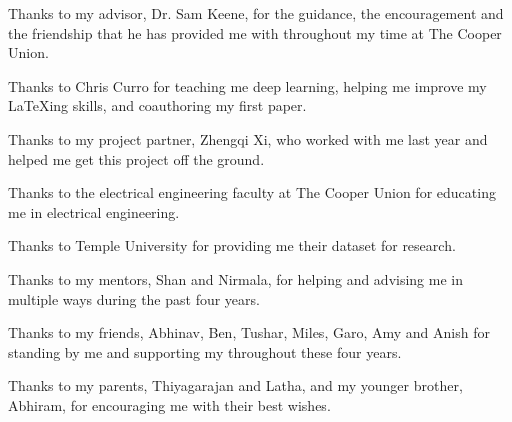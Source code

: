 \begin{acknowledgements}
		
	Thanks to my advisor, Dr. Sam Keene, for the guidance, the encouragement and the friendship that he has provided me with throughout my time at The Cooper Union. 
		
	\smallskip
		
	Thanks to Chris Curro for teaching me deep learning, helping me improve my \LaTeX ing skills, and coauthoring my first paper. 
		
	\smallskip
		
	Thanks to my project partner, Zhengqi Xi, who worked with me last year and helped me get this project off the ground.
		
	\smallskip
		
	Thanks to the electrical engineering faculty at The Cooper Union for educating me in electrical engineering.
		
	\smallskip
	Thanks to Temple University for providing me their dataset for research. 
	
	\smallskip
	Thanks to my mentors, Shan and Nirmala, for helping and advising me in multiple ways during the past four years. 
		
	\smallskip
		
	Thanks to my friends, Abhinav, Ben, Tushar, Miles, Garo, Amy and Anish for standing by me and supporting my throughout these four years. 
		
	\smallskip
		
	Thanks to my parents, Thiyagarajan and Latha, and my younger brother, Abhiram, for encouraging me with their best wishes. 
		
			
\end{acknowledgements}